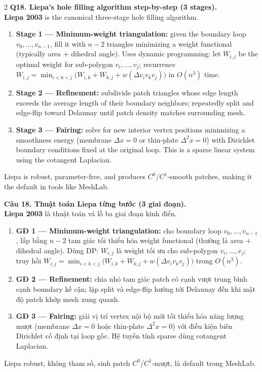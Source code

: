 \begin{paracol}{2}
\textbf{Q18. Liepa's hole filling algorithm step-by-step (3 stages).}\\
\textbf{Liepa 2003} is the canonical three-stage hole filling algorithm.
\begin{enumerate}[leftmargin=*,nosep]
\item \textbf{Stage 1 — Minimum-weight triangulation:} given the boundary loop $v_0,\dots,v_{n-1}$, fill it with $n-2$ triangles minimizing a weight functional (typically area + dihedral angle). Uses dynamic programming: let $W_{i,j}$ be the optimal weight for sub-polygon $v_i,\dots,v_j$; recurrence $W_{i,j} = \min_{i<k<j} \big(W_{i,k} + W_{k,j} + w(\Delta v_iv_kv_j)\big)$ in $O(n^3)$ time.
\item \textbf{Stage 2 — Refinement:} subdivide patch triangles whose edge length exceeds the average length of their boundary neighbors; repeatedly split and edge-flip toward Delaunay until patch density matches surrounding mesh.
\item \textbf{Stage 3 — Fairing:} solve for new interior vertex positions minimizing a smoothness energy (membrane $\Delta x = 0$ or thin-plate $\Delta^2 x = 0$) with Dirichlet boundary conditions fixed at the original loop. This is a sparse linear system using the cotangent Laplacian.
\end{enumerate}
Liepa is robust, parameter-free, and produces $C^0$/$C^1$-smooth patches, making it the default in tools like MeshLab.

\switchcolumn

\textbf{Câu 18. Thuật toán Liepa từng bước (3 giai đoạn).}\\
\textbf{Liepa 2003} là thuật toán vá lỗ ba giai đoạn kinh điển.
\begin{enumerate}[leftmargin=*,nosep]
\item \textbf{GĐ 1 — Minimum-weight triangulation:} cho boundary loop $v_0,\dots,v_{n-1}$, lấp bằng $n-2$ tam giác tối thiểu hóa weight functional (thường là area + dihedral angle). Dùng DP: $W_{i,j}$ là weight tối ưu cho sub-polygon $v_i,\dots,v_j$; truy hồi $W_{i,j} = \min_{i<k<j} \big(W_{i,k} + W_{k,j} + w(\Delta v_iv_kv_j)\big)$ trong $O(n^3)$.
\item \textbf{GĐ 2 — Refinement:} chia nhỏ tam giác patch có cạnh vượt trung bình cạnh boundary kế cận; lặp split và edge-flip hướng tới Delaunay đến khi mật độ patch khớp mesh xung quanh.
\item \textbf{GĐ 3 — Fairing:} giải vị trí vertex nội bộ mới tối thiểu hóa năng lượng mượt (membrane $\Delta x = 0$ hoặc thin-plate $\Delta^2 x = 0$) với điều kiện biên Dirichlet cố định tại loop gốc. Hệ tuyến tính sparse dùng cotangent Laplacian.
\end{enumerate}
Liepa robust, không tham số, sinh patch $C^0$/$C^1$-mượt, là default trong MeshLab.


\end{paracol}
